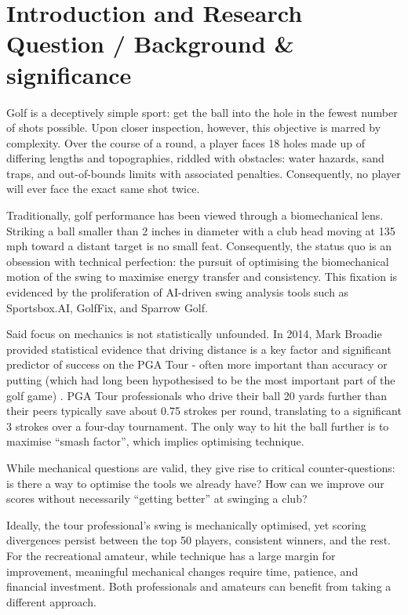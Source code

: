 \documentclass[11pt, letterpaper]{article}
\begin{document}
\newpage
\setcounter{page}{1} %

\section{Introduction and Research Question / Background \& significance}

Golf is a deceptively simple sport: get the ball into the hole in the fewest number of shots possible. Upon closer inspection, however, this objective is marred by complexity. Over the course of a round, a player faces 18 holes made up of differing lengths and topographies, riddled with obstacles: water hazards, sand traps, and out-of-bounds limits with associated penalties. Consequently, no player will ever face the exact same shot twice.

Traditionally, golf performance has been viewed through a biomechanical lens. Striking a ball smaller than 2 inches in diameter with a club head moving at 135 mph toward a distant target is no small feat. Consequently, the status quo is an obsession with technical perfection: the pursuit of optimising the biomechanical motion of the swing to maximise energy transfer and consistency. This fixation is evidenced by the proliferation of AI-driven swing analysis tools such as Sportsbox.AI, GolfFix, and Sparrow Golf.

Said focus on mechanics is not statistically unfounded. In 2014, Mark Broadie provided statistical evidence that driving distance is a key factor and significant predictor of success on the PGA Tour - often more important than accuracy or putting (which had long been hypothesised to be the most important part of the golf game) \parencite{Broadie_2014a}. PGA Tour professionals who drive their ball 20 yards further than their peers typically save about 0.75 strokes per round, translating to a significant 3 strokes over a four-day tournament. The only way to hit the ball further is to maximise “smash factor”, which implies optimising technique. 

While mechanical questions are valid, they give rise to critical counter-questions: is there a way to optimise the tools we already have? How can we improve our scores without necessarily “getting better” at swinging a club? 

Ideally, the tour professional's swing is mechanically optimised, yet scoring divergences persist between the top 50 players, consistent winners, and the rest. For the recreational amateur, while technique has a large margin for improvement, meaningful mechanical changes require time, patience, and financial investment. Both professionals and amateurs can benefit from taking a different approach.
\end{document}
